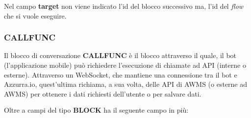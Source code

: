 
Nel campo \textbf{target} non viene indicato l'id del blocco successivo ma, l'id del \emph{flow} che si vuole eseguire.

\subsubsection{CALLFUNC}

Il blocco di conversazione \textbf{CALLFUNC} è il blocco attraverso il quale, il bot (l'applicazione mobile) può richiedere l’esecuzione di chiamate ad API (interne o esterne). Attraverso un WebSocket, che mantiene una connessione tra il bot e Azzurra.io, quest’ultima richiama, a sua volta, delle API di AWMS (o esterne ad AWMS) per ottenere i dati richiesti dell’utente o per salvare dati. 


Oltre a campi del tipo \textbf{BLOCK} ha il seguente campo in più:

